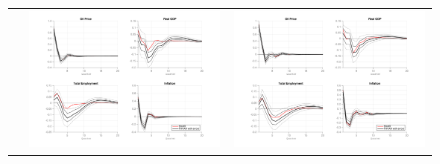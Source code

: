 \documentclass[11pt,a4paper]{article}
\begin{document}
\begin{landscape}
\begin{figure}[H]
\begin{center}
\begin{tabular}{ccc}
				&\includegraphics[width=9cm]{Figures/rob_FAVAR_2} &  \includegraphics[width=9cm]{Figures/rob_FAVAR_3}			\end{tabular}
		\end{center}
		\end{figure}
	\end{landscape}
\end{document}
